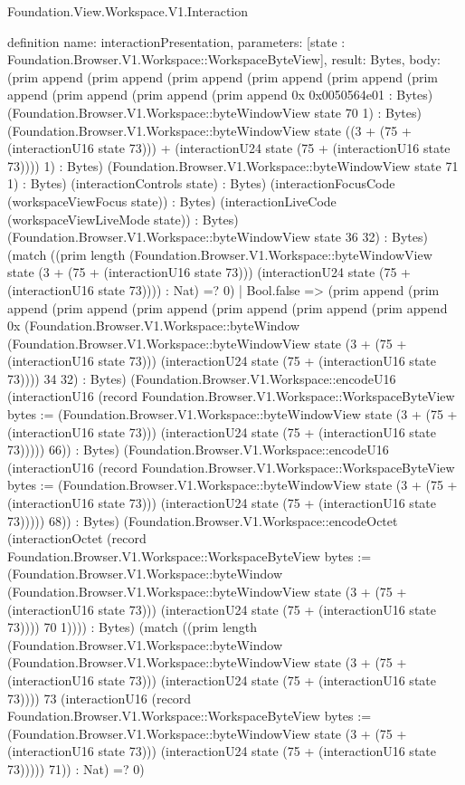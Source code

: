 \begin{lexlean}{Foundation.View.Workspace.V1.Interaction}
\begin{semanticmodule}
definition{
  name: interactionPresentation,
  parameters: [state : Foundation.Browser.V1.Workspace::WorkspaceByteView],
  result: Bytes,
  body: (prim append (prim append (prim append (prim append (prim append (prim append (prim append (prim append (prim append 0x 0x0050564e01 : Bytes) (Foundation.Browser.V1.Workspace::byteWindowView state 70 1) : Bytes) (Foundation.Browser.V1.Workspace::byteWindowView state ((3 + (75 + (interactionU16 state 73))) + (interactionU24 state (75 + (interactionU16 state 73)))) 1) : Bytes) (Foundation.Browser.V1.Workspace::byteWindowView state 71 1) : Bytes) (interactionControls state) : Bytes) (interactionFocusCode (workspaceViewFocus state)) : Bytes) (interactionLiveCode (workspaceViewLiveMode state)) : Bytes) (Foundation.Browser.V1.Workspace::byteWindowView state 36 32) : Bytes) (match ((prim length (Foundation.Browser.V1.Workspace::byteWindowView state (3 + (75 + (interactionU16 state 73))) (interactionU24 state (75 + (interactionU16 state 73)))) : Nat) =? 0)
    | Bool.false => (prim append (prim append (prim append (prim append (prim append (prim append (prim append 0x (Foundation.Browser.V1.Workspace::byteWindow (Foundation.Browser.V1.Workspace::byteWindowView state (3 + (75 + (interactionU16 state 73))) (interactionU24 state (75 + (interactionU16 state 73)))) 34 32) : Bytes) (Foundation.Browser.V1.Workspace::encodeU16 (interactionU16 (record Foundation.Browser.V1.Workspace::WorkspaceByteView {bytes := (Foundation.Browser.V1.Workspace::byteWindowView state (3 + (75 + (interactionU16 state 73))) (interactionU24 state (75 + (interactionU16 state 73))))}) 66)) : Bytes) (Foundation.Browser.V1.Workspace::encodeU16 (interactionU16 (record Foundation.Browser.V1.Workspace::WorkspaceByteView {bytes := (Foundation.Browser.V1.Workspace::byteWindowView state (3 + (75 + (interactionU16 state 73))) (interactionU24 state (75 + (interactionU16 state 73))))}) 68)) : Bytes) (Foundation.Browser.V1.Workspace::encodeOctet (interactionOctet (record Foundation.Browser.V1.Workspace::WorkspaceByteView {bytes := (Foundation.Browser.V1.Workspace::byteWindow (Foundation.Browser.V1.Workspace::byteWindowView state (3 + (75 + (interactionU16 state 73))) (interactionU24 state (75 + (interactionU16 state 73)))) 70 1)}))) : Bytes) (match ((prim length (Foundation.Browser.V1.Workspace::byteWindow (Foundation.Browser.V1.Workspace::byteWindowView state (3 + (75 + (interactionU16 state 73))) (interactionU24 state (75 + (interactionU16 state 73)))) 73 (interactionU16 (record Foundation.Browser.V1.Workspace::WorkspaceByteView {bytes := (Foundation.Browser.V1.Workspace::byteWindowView state (3 + (75 + (interactionU16 state 73))) (interactionU24 state (75 + (interactionU16 state 73))))}) 71)) : Nat) =? 0)
}
\end{semanticmodule}
\end{lexlean}
